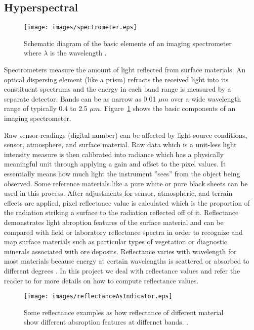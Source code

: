 \subsection{Hyperspectral}

\begin{figure}[b!]
  \centering
    \texttt{[image: images/spectrometer.eps]}
    \caption[Imaging spectrometer schematic diagram]{Schematic diagram of the basic elements of an imaging spectrometer where $\lambda$ is the wavelength \citep{smith2006introduction}.}
    \label{fig:Imaging spectrometer}
\end{figure}

Spectrometers measure the amount of light reflected from surface materials: An optical dispersing element (like a prism) refracts the received light into its constituent spectrums and the energy in each band range is measured by a separate detector. Bands can be as narrow as 0.01 $μm$ over a wide wavelength range of typically 0.4 to 2.5 $μm$. Figure~\ref{fig:Imaging spectrometer} shows the basic components of an imaging spectrometer.

Raw sensor readings (digital number) can be affected by light source conditions, sensor, atmosphere, and surface material. Raw data which is a unit-less light intensity measure is then calibrated into radiance which has a  physically meaningful unit through applying a gain and offset to the pixel values. It essentially means how much light the instrument ''sees'' from the object being observed. Some reference materials like a pure white or pure black sheets can be used in this process. After adjustments for sensor, atmospheric, and terrain effects are applied, pixel reflectance value is calculated which is the proportion of the radiation striking a surface to the radiation reflected off of it. Reflectance demonstrates light abroption features of the surface material and can be compared with field or laboratory reflectance spectra in order to recognize and map surface materials such as particular types of vegetation or diagnostic minerals associated with ore deposits. Reflectance varies with wavelength for most materials because energy at certain wavelengths is scattered or absorbed to different degrees \citep{smith2006introduction}. In this project we deal with reflectance values and refer the reader to \citep{varshney2004advanced} for more details on how to compute reflectance values.

\begin{figure}[t!]

  \centering
    \texttt{[image: images/reflectanceAsIndicator.eps]}
    \caption[Some reflectance examples]{Some reflectance examples as how reflectance of different material show different absroption features at differnet bands. \citep{smith2006introduction}.}
    \label{fig:Some reflectance examples}
\end{figure}

